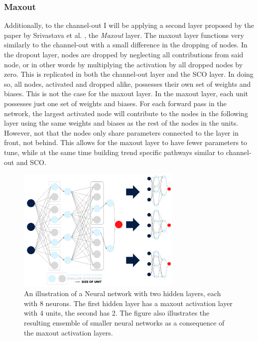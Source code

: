 \subsubsection*{Maxout}\label{subsubsec:maxout} 
Additionally, to the channel-out I will be applying a second layer proposed by the paper by Srivastava et al. \cite{wang_maxout_2013}, 
the \emph{Maxout} layer. The maxout layer functions very similarly to the channel-out with a small difference in the dropping of nodes. 
In the dropout layer, nodes are dropped by neglecting all contributions from said node, or in other words by multiplying the activation 
by all dropped nodes by zero. This is replicated in both the channel-out layer and the \ac{SCO} layer. In doing so, all nodes, activated 
and dropped alike, possesses their own set of weights and biases. This is not the case for the maxout layer.
In the maxout layer, each unit possesses just one set of weights and biases. For each forward pass in the network, the largest activated 
node will contribute to the nodes in the following layer using the same weights and biases as the rest of the nodes in the units. However, not 
that the nodes only share parameters connected to the layer in front, not behind. This allows for the maxout layer to have fewer parameters to 
tune, while at the same time building trend specific pathways similar to channel-out and \ac{SCO}. \\
\begin{figure}
    \centering
    \includegraphics[width=0.7\textwidth]{Figures/Illustrations/Max_out.png}
    \caption[An illustration of a Neural network with two hidden layers using the maxout layer.]{An illustration of a Neural network with two hidden layers, each with 8 neurons.
    The first hidden layer has a maxout activation layer with 4 units, the second has 2.
    The figure also illustrates  the resulting ensemble of smaller neural networks as a consequence
    of the maxout activation layers. }
    \label{fig:Max_out}
\end{figure}
